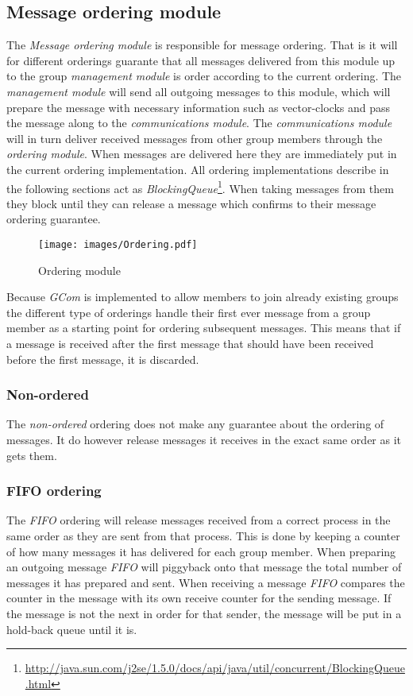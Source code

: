 \documentclass[titlepage, twocolumn, a4paper, 10pt]{article}
\begin{document}
\subsection{Message ordering module}\label{sec:message-ordering-module}
The \textit{Message ordering module} is responsible for message
ordering. That is it will for different orderings guarante that all
messages delivered from this module up to the group \textit{management
  module} is order according to the current ordering. The
\textit{management module} will send all outgoing messages to this
module, which will prepare the message with necessary information such
as vector-clocks and pass the message along to the
\textit{communications module}. The \textit{communications module}
will in turn deliver received messages from other group members
through the \textit{ordering module}. When messages are delivered here
they are immediately put in the current ordering implementation. All
ordering implementations describe in the following sections act as
\textit{BlockingQueue}\footnote{\url{http://java.sun.com/j2se/1.5.0/docs/api/java/util/concurrent/BlockingQueue.html}}.
When taking messages from them they block until they can release a
message which confirms to their message ordering guarantee.

\begin{figure}[!thb]
  \centering
  \texttt{[image: images/Ordering.pdf]}
  \caption{Ordering module}
  \label{fig:images/ordering}
\end{figure}

Because \textit{GCom} is implemented to allow members to join already
existing groups the different type of orderings handle their first
ever message from a group member as a starting point for ordering
subsequent messages. This means that if a message is received after
the first message that should have been received before the first
message, it is discarded.

\subsubsection{Non-ordered}\label{sec:-non-ordered}
The \textit{non-ordered} ordering does not make any guarantee about
the ordering of messages. It do however release messages it receives
in the exact same order as it gets them.

\subsubsection{FIFO ordering}\label{sec:fifo}
The \textit{FIFO} ordering will release messages received from a
correct process in the same order as they are sent from that process.
This is done by keeping a counter of how many messages it has
delivered for each group member. When preparing an outgoing message
\textit{FIFO} will piggyback onto that message the total number of
messages it has prepared and sent. When receiving a message
\textit{FIFO} compares the counter in the message with its own receive
counter for the sending message. If the message is not the next in
order for that sender, the message will be put in a hold-back queue
until it is.
\end{document}
